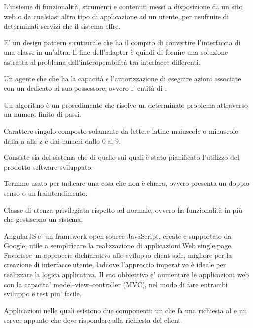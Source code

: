 \Inizio{}




{L'insieme di funzionalità, strumenti e contenuti messi a disposizione da un sito web o da qualsiasi altro tipo di applicazione ad un utente, per usufruire di determinati servizi che il sistema offre.}

{E' un design pattern strutturale che ha il compito di convertire l’interfaccia di una classe in un’altra.
Il fine dell'adapter è quindi di fornire una soluzione astratta al problema dell'interoperabilità tra interfacce differenti.

{Un agente che che ha la capacità e l'autorizzazione di eseguire azioni associate con un  dedicato al suo possessore, ovvero l' entità di .}

{Un algoritmo è un procedimento che risolve un determinato problema attraverso un numero finito di passi.} 

{Carattere singolo composto solamente da lettere latine maiuscole o minuscole dalla a alla z e dai numeri dallo 0 al 9.}

{Consiste sia del sistema  che di quello  sui quali è stato pianificato l'utilizzo del prodotto software sviluppato.}

{Termine usato per indicare una cosa che non è chiara, ovvero presenta un doppio senso o un fraintendimento.}

{Classe di utenza privilegiata rispetto ad  normale, ovvero ha funzionalità in più che gestiscono un sistema.}

{AngularJS e' un framework open-source JavaScript, creato e supportato da  Google, utile a semplificare la realizzazione di applicazioni Web single page.
 Favorisce un approccio dichiarativo allo sviluppo client-side, migliore per la creazione di interfacce utente, laddove l’approccio imperativo è ideale per realizzare la logica applicativa.
 Il suo obbiettivo e' aumentare le applicazioni web con la capacita' model–view–controller (MVC), nel modo di fare entrambi sviluppo e test piu' facile.}

{Applicazioni nelle quali esistono due componenti: un  che fa una richiesta al  e un server appunto che deve rispondere alla richiesta del client.}

}
